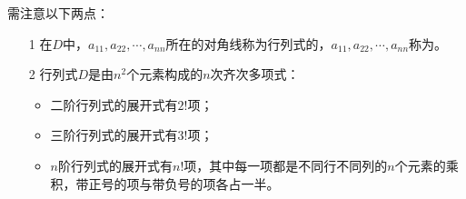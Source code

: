 \begin{frame}
\begin{zhu}
  需注意以下两点：
  \begin{enumerate}
  \item[1]
    在$D$中，$a_{11},a_{22},\cdots,a_{nn}$所在的对角线称为行列式的，$a_{11},a_{22},\cdots,a_{nn}$称为。\\[.1in]
  \item[2]
    行列式$D$是由$n^2$个元素构成的$n$次齐次多项式：\\[.1in]
    \begin{itemize}
    \item 二阶行列式的展开式有$2!$项；\\[.1in]
    \item 三阶行列式的展开式有$3!$项；\\[.1in]
    \item $n$阶行列式的展开式有$n!$项，其中每一项都是不同行不同列的$n$个元素的乘积，带正号的项与带负号的项各占一半。
    \end{itemize}      
  \end{enumerate}    
\end{zhu}
\end{frame}

